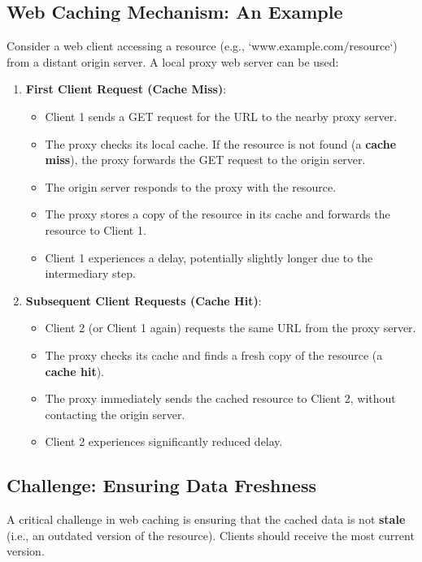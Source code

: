 \documentclass[../../compsys.tex]{subfiles}
\begin{document}
\subsection{Web Caching Mechanism: An Example}
Consider a web client accessing a resource (e.g., `www.example.com/resource`) from a distant origin server. A local proxy web server can be used:
\begin{enumerate}
    \item \textbf{First Client Request (Cache Miss)}:
    \begin{itemize}
        \item Client 1 sends a GET request for the URL to the nearby proxy server.
        \item The proxy checks its local cache. If the resource is not found (a \textbf{cache miss}), the proxy forwards the GET request to the origin server.
        \item The origin server responds to the proxy with the resource.
        \item The proxy stores a copy of the resource in its cache and forwards the resource to Client 1.
        \item Client 1 experiences a delay, potentially slightly longer due to the intermediary step.
    \end{itemize}
    \item \textbf{Subsequent Client Requests (Cache Hit)}:
    \begin{itemize}
        \item Client 2 (or Client 1 again) requests the same URL from the proxy server.
        \item The proxy checks its cache and finds a fresh copy of the resource (a \textbf{cache hit}).
        \item The proxy immediately sends the cached resource to Client 2, without contacting the origin server.
        \item Client 2 experiences significantly reduced delay.
    \end{itemize}
\end{enumerate}

\subsection{Challenge: Ensuring Data Freshness}
A critical challenge in web caching is ensuring that the cached data is not \textbf{stale} (i.e., an outdated version of the resource). Clients should receive the most current version.
\end{document}
